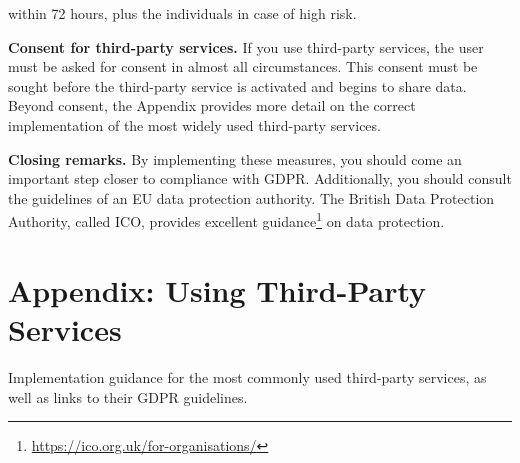 \documentclass[
	12pt,
	a4paper,
	]{scrartcl}
\begin{document}
	within 72 hours, plus the individuals in case of high risk.
	
	\textbf{Consent for third-party services.}
	If you use third-party services, the user must be asked for consent in 
	almost all circumstances.
	This consent must be sought before the third-party service is 
	activated 
	and begins to share data.
	Beyond consent, the Appendix
	provides 
	more detail on the correct implementation of the most widely used 
	third-party services.
	
	\textbf{Closing remarks.}
	By implementing these measures, you should come an important step 
	closer 
	to compliance with GDPR.
	Additionally, you should consult the guidelines of an EU data 
	protection 
	authority.
	The British Data Protection Authority, called ICO, provides excellent 
	guidance\footnote{\url{https://ico.org.uk/for-organisations/}} on data 
	protection.
	
	\pagebreak
	
	\section*{Appendix: Using Third-Party Services}
	Implementation guidance for the most commonly used third-party 
	services, as well as links to their GDPR guidelines.
	
\end{document}
